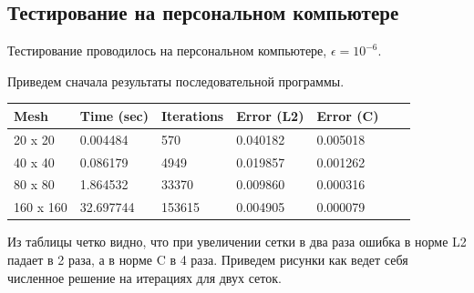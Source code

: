 \documentclass[12pt]{article}
\begin{document}
\subsection{Тестирование на персональном компьютере}

Тестирование проводилось на персональном компьютере, $\epsilon = 10^{-6}$.

Приведем сначала результаты последовательной программы.
\begin{center}
\begin{tabular}{lllllll}
Mesh & Time (sec) & Iterations & Error (L2) & Error (C) \\
\hline
20 x 20 & 0.004484 & 570 & 0.040182 & 0.005018 \\
40 x 40 & 0.086179 & 4949 & 0.019857 & 0.001262 \\
80 x 80 & 1.864532 & 33370 & 0.009860 & 0.000316 \\
160 x 160 & 32.697744 & 153615 & 0.004905 & 0.000079 \\
\hline
\end{tabular}
\end{center}
Из таблицы четко видно, что при увеличении сетки в два раза ошибка в норме L2 падает
в 2 раза, а в норме C в 4 раза. Приведем рисунки как ведет себя
численное решение на итерациях для двух сеток.
\end{document}
